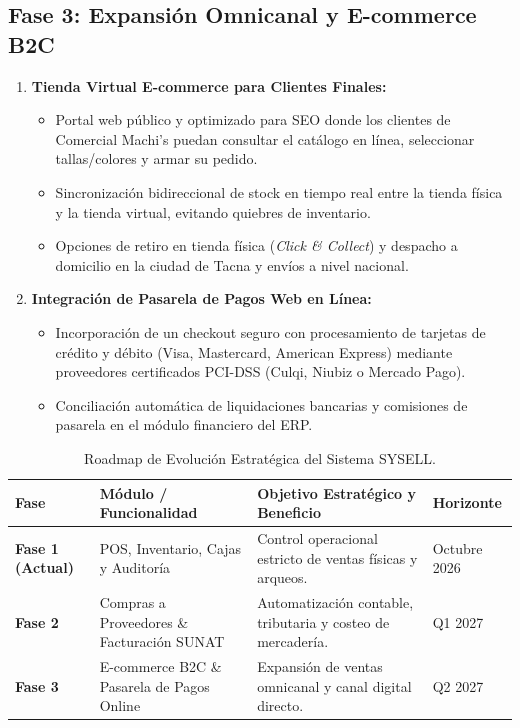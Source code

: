 \subsection{Fase 3: Expansión Omnicanal y E-commerce B2C}

\begin{enumerate}[leftmargin=*]
    \item \textbf{Tienda Virtual E-commerce para Clientes Finales:}
    \begin{itemize}
        \item Portal web público y optimizado para SEO donde los clientes de Comercial Machi's puedan consultar el catálogo en línea, seleccionar tallas/colores y armar su pedido.
        \item Sincronización bidireccional de stock en tiempo real entre la tienda física y la tienda virtual, evitando quiebres de inventario.
        \item Opciones de retiro en tienda física (\textit{Click \& Collect}) y despacho a domicilio en la ciudad de Tacna y envíos a nivel nacional.
    \end{itemize}

    \item \textbf{Integración de Pasarela de Pagos Web en Línea:}
    \begin{itemize}
        \item Incorporación de un checkout seguro con procesamiento de tarjetas de crédito y débito (Visa, Mastercard, American Express) mediante proveedores certificados PCI-DSS (Culqi, Niubiz o Mercado Pago).
        \item Conciliación automática de liquidaciones bancarias y comisiones de pasarela en el módulo financiero del ERP.
    \end{itemize}
\end{enumerate}

\begin{table}[H]
\centering
\small
\begin{tabularx}{\linewidth}{l>{\raggedright\arraybackslash}p{4cm}>{\raggedright\arraybackslash}Xl}
\toprule
\rowcolor{LightSlate}
\textbf{Fase} & \textbf{Módulo / Funcionalidad} & \textbf{Objetivo Estratégico y Beneficio} & \textbf{Horizonte} \\
\midrule
\textbf{Fase 1 (Actual)} & POS, Inventario, Cajas y Auditoría & Control operacional estricto de ventas físicas y arqueos. & Octubre 2026 \\
\midrule
\textbf{Fase 2} & Compras a Proveedores \& Facturación SUNAT & Automatización contable, tributaria y costeo de mercadería. & Q1 2027 \\
\midrule
\textbf{Fase 3} & E-commerce B2C \& Pasarela de Pagos Online & Expansión de ventas omnicanal y canal digital directo. & Q2 2027 \\
\bottomrule
\end{tabularx}
\caption{Roadmap de Evolución Estratégica del Sistema SYSELL.}
\label{tab:roadmap_sysell}
\end{table}
